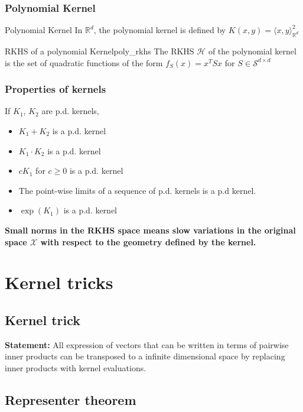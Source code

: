 \documentclass[10pt]{article}
\begin{document}
\subsubsection{Polynomial Kernel}

\begin{Definition}{Polynomial Kernel}{}
  In $\mathbb{R}^d$, the polynomial kernel is defined by $K(x, y) = \langle x, y 
  \rangle_{\mathbb{R}^d}^2$
\end{Definition}

\begin{Theorem}{RKHS of a polynomial Kernel}{poly_rkhs}
  The RKHS $\mathcal{H}$ of the polynomial kernel is the set of quadratic 
  functions of the form $f_S(x) = x^T S x$ for $S \in \mathcal{S}^{d\times d}$ 
\end{Theorem}

\subsubsection{Properties of kernels} 

If $K_1$, $K_2$ are p.d. kernels, 
\begin{itemize}
  \item $K_1 + K_2$ is a p.d. kernel
  \item $K_1\cdot K_2$ is a p.d. kernel
  \item $cK_1$ for $c\geq 0$ is a p.d. kernel
  \item The point-wise limits of a sequence of p.d. kernels is a p.d kernel.
  \item $\exp(K_1)$ is a p.d. kernel
\end{itemize}

\textbf{Small norms in the RKHS space means slow variations in the original
space $\mathcal{X}$ with respect to the geometry defined by the kernel.}
\section{Kernel tricks}

\subsection{Kernel trick}
\textbf{Statement:} All expression of vectors that can be written in terms of 
pairwise inner products can be transposed to a infinite dimensional space by 
replacing inner products with kernel evaluations. 

\subsection{Representer theorem}
\end{document}
